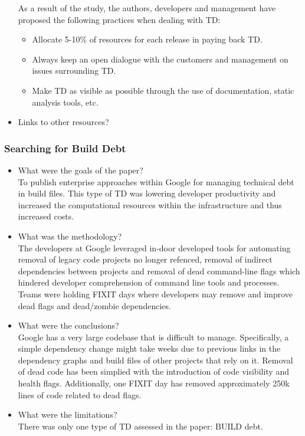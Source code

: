 \documentclass{mprop}
\begin{document}
\begin{itemize}
	      As a result of the study, the authors, developers and management have proposed the following practices when dealing with TD:
	      \begin{itemize}
		      \item Allocate 5-10\% of resources for each release in paying back TD.
		      \item Always keep an open dialogue with the customers and management on issues surrounding TD.
		      \item Make TD as visible as possible through the use of documentation, static analysis tools, etc.
	      \end{itemize}
	\item Links to other resources? \\
\end{itemize}

\subsubsection{Searching for Build Debt} \cite{Morgenthaler2012}
\begin{itemize}
	\item What were the goals of the paper? \\
	      To publish enterprise approaches within Google for managing technical debt in build files.
	      This type of TD was lowering developer productivity and increased the computational resources within the infrastructure and thus increased costs.
	\item What was the methodology? \\
	      The developers at Google leveraged in-door developed tools for automating removal of legacy code projects no longer refenced, removal of indirect dependencies between projects and removal of dead command-line flags which hindered developer comprehension of command line tools and processes.
	      Teams were holding FIXIT days where developers may remove and improve dead flags and dead/zombie dependencies.
	\item What were the conclusions? \\
	      Google has a very large codebase that is difficult to manage.
	      Specifically, a simple dependency change might take weeks due to previous links in the dependency graphs and build files of other projects that rely on it.
	      Removal of dead code has been simplied with the introduction of code visibility and health flags.
	      Additionally, one FIXIT day has removed approximately 250k lines of code related to dead flags.
	\item What were the limitations? \\
	      There was only one type of TD assessed in the paper: BUILD debt.
\end{itemize}
\end{document}
